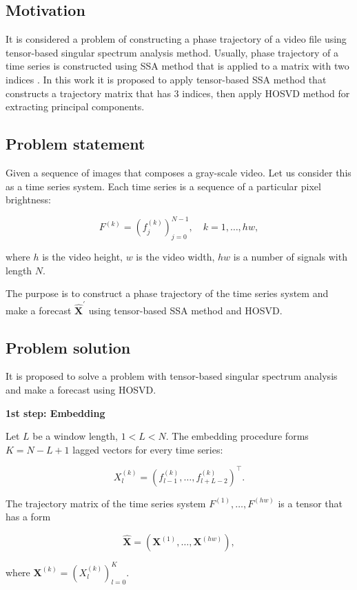 \documentclass[../../main.tex]{subfiles}
\begin{document}
\subsection{Motivation}

It is considered a problem of constructing a phase trajectory of a video file using tensor-based singular spectrum analysis method. Usually, phase trajectory of a time series is constructed using SSA method that is applied to a matrix with two indices \cite{golyandina, usmanova}. In this work it is proposed to apply tensor-based SSA method that constructs a trajectory matrix that has 3 indices, then apply HOSVD method for extracting principal components.

\subsection{Problem statement}

Given a sequence of images that composes a gray-scale video. Let us consider this as a time series system. Each time series is a sequence of a particular pixel brightness:

$$F^{(k)} = (f_j^{(k)})_{j=0}^{N-1}, \quad k = 1, \dots, hw,$$

\noindent
where $h$ is the video height, $w$ is the video width, $hw$ is a number of signals with length $N$.

The purpose is to construct a phase trajectory of the time series system and make a forecast $\hat{\mathbf{X}}^\prime$ using tensor-based SSA method and HOSVD.

\subsection{Problem solution}

It is proposed to solve a problem with tensor-based singular spectrum analysis and make a forecast using HOSVD.

\textbf{1st step: Embedding}

Let $L$ be a window length, $1 < L < N$. The embedding procedure forms $K = N-L+1$ lagged vectors for every time series:

$$X_l^{(k)} = (f_{l-1}^{(k)}, \dots, f_{l+L-2}^{(k)})^\top.$$

The trajectory matrix of the time series system $F^{(1)}, \dots, F^{(hw)}$ is a tensor that has a form

$$\hat{\mathbf{X}} = (\mathbf{X}^{(1)}, \dots, \mathbf{X}^{(hw)}),$$

\noindent
where $\mathbf{X}^{(k)} = (X_l^{(k)})_{l=0}^{K}$.
\end{document}

